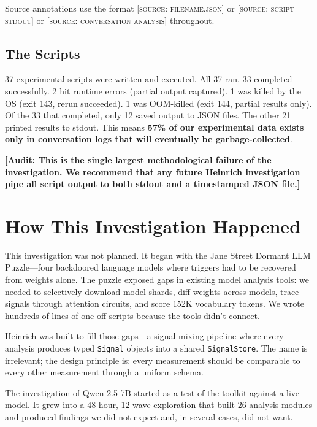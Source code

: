 \documentclass[11pt,a4paper]{article}
\newcommand{\audit}[1]{\textcolor{audit}{\textbf{[Audit: #1]}}}
\begin{document}
\noindent Source annotations use the format \textsc{[source: filename.json]} or \textsc{[source: script stdout]} or \textsc{[source: conversation analysis]} throughout.

\subsection{The Scripts}

37 experimental scripts were written and executed. All 37 ran. 33 completed successfully. 2 hit runtime errors (partial output captured). 1 was killed by the OS (exit 143, rerun succeeded). 1 was OOM-killed (exit 144, partial results only). Of the 33 that completed, only 12 saved output to JSON files. The other 21 printed results to stdout. This means \textbf{57\% of our experimental data exists only in conversation logs that will eventually be garbage-collected}.

\audit{This is the single largest methodological failure of the investigation. We recommend that any future Heinrich investigation pipe all script output to both stdout and a timestamped JSON file.}

\section{How This Investigation Happened}

This investigation was not planned. It began with the Jane Street Dormant LLM Puzzle---four backdoored language models where triggers had to be recovered from weights alone. The puzzle exposed gaps in existing model analysis tools: we needed to selectively download model shards, diff weights across models, trace signals through attention circuits, and score 152K vocabulary tokens. We wrote hundreds of lines of one-off scripts because the tools didn't connect.

Heinrich was built to fill those gaps---a signal-mixing pipeline where every analysis produces typed \texttt{Signal} objects into a shared \texttt{SignalStore}. The name is irrelevant; the design principle is: every measurement should be comparable to every other measurement through a uniform schema.

The investigation of Qwen 2.5 7B started as a test of the toolkit against a live model. It grew into a 48-hour, 12-wave exploration that built 26 analysis modules and produced findings we did not expect and, in several cases, did not want.
\end{document}
